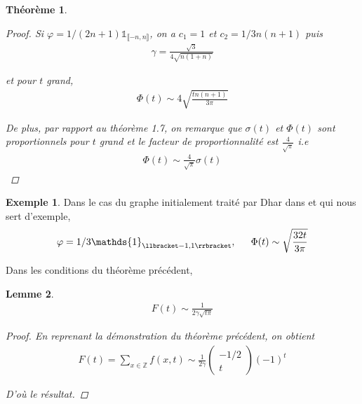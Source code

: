 \documentclass{article}
\newtheorem{theorem}{Théorème}[section]
\newtheorem{lemma}[theorem]{Lemme}
\theoremstyle{definition}
\newtheorem{exmp}{Exemple}[section]
\begin{document}
\begin{theorem}
\begin{proof}
Si $\varphi=1/(2n+1)\mathds{1}_{\llbracket-n,n\rrbracket}$, on a $c_1=1$ et $c_2=1/3 n(n+1)$ puis 
\begin{align*}
	\gamma=\frac{\sqrt{3}}{4\sqrt{n(1+n)}}
\end{align*}

et pour $t$ grand, 
\begin{align*}
	\Phi(t) \sim 4\sqrt{\frac{tn(n+1)}{3\pi}}
\end{align*} 

De plus, par rapport au théorème 1.7, on remarque que $\sigma(t)$ et $\Phi(t)$ sont proportionnels pour $t$ grand et le facteur de proportionnalité est $\frac{4}{\sqrt{\pi}}$ i.e \begin{align*}
			\Phi(t) \sim \frac{4}{\sqrt{\pi}} \sigma(t)\end{align*}
		\end{proof}\end{theorem}
		\begin{exmp}
			Dans le cas du graphe initialement traité par Dhar dans \cite{DHARBIS} et qui nous sert d'exemple,
			\begin{align*}
			\varphi = 1/3\mathds{1}_{\llbracket -1, 1\rrbracket}, \indent \Phi(t) \sim \sqrt{\frac{32 t}{3\pi}}\end{align*}
		\end{exmp}
Dans les conditions du théorème précédent,
		\begin{lemma}
			\begin{align*}
			F(t) \sim \frac{1}{2\gamma \sqrt{t \pi}}\end{align*}
		\begin{proof}
		En reprenant la démonstration du théorème précédent, on obtient \begin{align*}
			F(t) = \sum_{x\in\mathbb{Z}}f(x,t) \sim \frac{1}{2\gamma}\begin{pmatrix}-1/2\\t\end{pmatrix}(-1)^t
		\end{align*}

		D'où le résultat.
	\end{proof}
\end{lemma}
\end{document}
